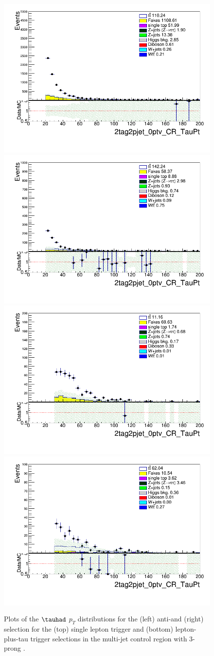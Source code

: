\begin{figure}
\centering
\includegraphics[width=.45\textwidth]{figures/lephadFF/SLT/2tag2pjet_0ptv_CR_TauPt_IICR_SLT_ALL_ttWeight_3.png}
\includegraphics[width=.45\textwidth]{figures/lephadFF/SLT/2tag2pjet_0ptv_CR_TauPt_IISR_SLT_ALL_ttWeight_3.png} \\
\includegraphics[width=.45\textwidth]{figures/lephadFF/LTT/2tag2pjet_0ptv_CR_TauPt_IICR_LTT_ALL_ttWeight_3.png}
\includegraphics[width=.45\textwidth]{figures/lephadFF/LTT/2tag2pjet_0ptv_CR_TauPt_IISR_LTT_ALL_ttWeight_3.png}\\
\caption{Plots of the $\tauhad$ $p_T$ distributions for the (left) anti-\tauhad and (right) \tauhad selection for the (top) single lepton trigger and (bottom) lepton-plus-tau trigger selections in the multi-jet control region with 3-prong \tauhad.}
\label{fig:QCD_CR_3}
\end{figure}



